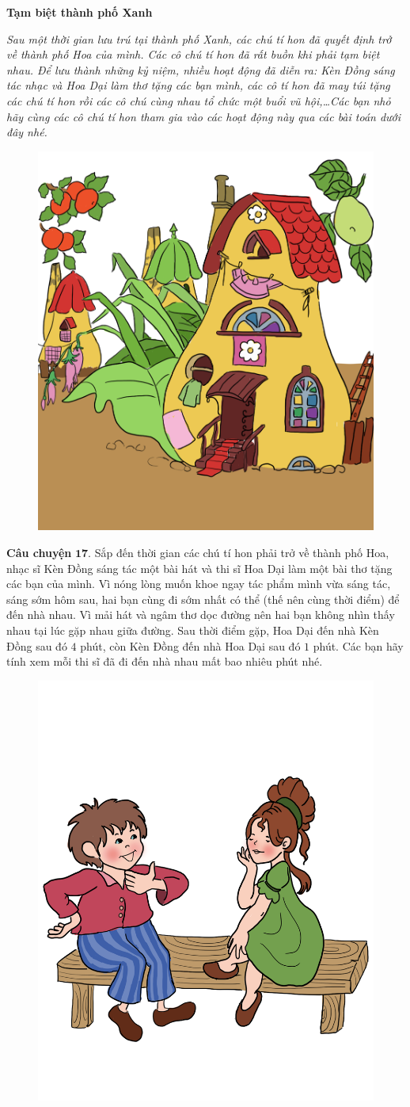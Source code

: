	\centerline{\textbf{\color{toancuabi}Tạm biệt thành phố Xanh}}
	\vskip 0.1cm
	\textit{Sau một thời gian lưu trú tại thành phố Xanh, các chú tí hon đã quyết định trở về thành phố Hoa của mình. Các cô chú tí hon đã rất buồn khi phải tạm biệt nhau. Để lưu thành những kỷ niệm, nhiều hoạt động đã diễn ra: Kèn Đồng sáng tác nhạc và Hoa Dại làm thơ tặng các bạn mình, các cô tí hon đã may túi tặng các chú tí hon rồi các cô chú cùng nhau tổ chức một buổi vũ hội,\ldots Các bạn nhỏ hãy cùng các cô chú tí hon tham gia vào các hoạt động này qua các bài toán dưới đây nhé.}
	
	\begin{figure}[H]
		\centering
		\vspace*{-5pt}
		\captionsetup{labelformat= empty, justification=centering}
		\includegraphics[width=0.3\linewidth]{Hinh10_ThanhPhoXanh}
		\vspace*{-10pt}
	\end{figure}
	\textbf{\color{toancuabi}Câu chuyện} $\pmb{17.}$ Sắp đến thời gian các chú tí hon phải trở về thành phố Hoa, nhạc sĩ Kèn Đồng sáng tác một bài hát và thi sĩ Hoa Dại làm một bài thơ tặng các bạn của mình. Vì nóng lòng muốn khoe ngay tác phẩm mình vừa sáng tác, sáng sớm hôm sau, hai bạn cùng đi sớm nhất có thể (thế nên cùng thời điểm) để đến nhà nhau. Vì mải hát và ngâm thơ dọc đường nên hai bạn không nhìn thấy nhau tại lúc gặp nhau giữa đường. Sau thời điểm gặp, Hoa Dại đến nhà Kèn Đồng sau đó $4$ phút, còn Kèn Đồng đến nhà Hoa Dại sau đó $1$ phút. Các bạn hãy tính xem mỗi thi sĩ đã đi đến nhà nhau mất bao nhiêu phút nhé.
		\begin{figure}[H]
		\centering
		\vspace*{-5pt}
		\captionsetup{labelformat= empty, justification=centering}
		\includegraphics[width=0.45\linewidth]{Hinh19_KenDong_HoaGiay}
		\vspace*{-15pt}
	\end{figure}
